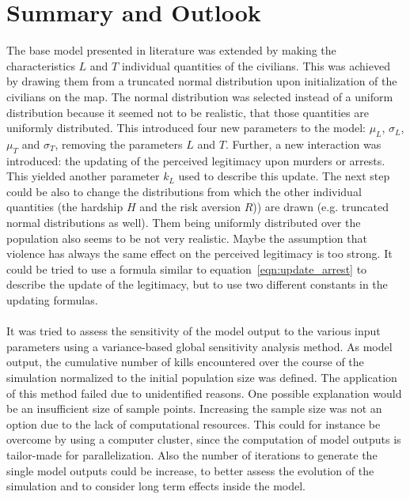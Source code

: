 \documentclass[11pt]{article}
\begin{document}
\section{Summary and Outlook}
The base model presented in literature was extended by making the characteristics $L$ and $T$ individual quantities of the civilians. This was achieved by drawing them from a truncated normal distribution upon initialization of the civilians on the map. The normal distribution was selected instead of a uniform distribution because it seemed not to be realistic, that those quantities are uniformly distributed. This introduced four new parameters to the model: $\mu_L$, $\sigma_L$, $\mu_T$ and $\sigma_T$, removing the parameters $L$ and $T$. Further, a new interaction was introduced: the updating of the perceived legitimacy upon murders or arrests. This yielded another parameter $k_L$ used to describe this update. The next step could be also to change the distributions from which the other individual quantities (the hardship $H$ and the risk aversion $R$)) are drawn (e.g. truncated normal distributions as well). Them being uniformly distributed over the population also seems to be not very realistic. Maybe the assumption that violence has always the same effect on the perceived legitimacy is too strong. It could be tried to use a formula similar to equation~\eqref{eqn:update_arrest} to describe the update of the legitimacy, but to use two different constants in the updating formulas.\\
\\
It was tried to assess the sensitivity of the model output to the various input parameters using a variance-based global sensitivity analysis method. As model output, the cumulative number of kills encountered over the course of the simulation normalized to the initial population size was defined. The application of this method failed due to unidentified reasons. One possible explanation would be an insufficient size of sample points. Increasing the sample size was not an option due to the lack of computational resources. This could for instance be overcome by using a computer cluster, since the computation of model outputs is tailor-made for parallelization. Also the number of iterations to generate the single model outputs could be increase, to better assess the evolution of the simulation and to consider long term effects inside the model.\\
\\
\end{document}
